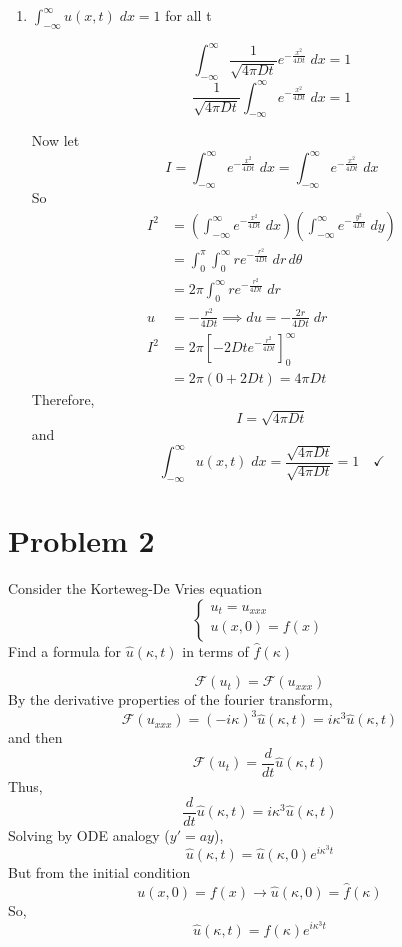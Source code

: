 \documentclass[12pt]{article}
\newcommand{\ans}[1]{\boxed{\text{#1}}}
\renewcommand{\hat}[1]{\widehat{#1}}
\newcommand{\F}[1]{\mathcal{F}(#1)}
\begin{document}
\begin{enumerate}
    \color{black}
    \item $\int_{-\infty}^\infty u(x, t) \; dx = 1$ for all t 
    
    \color{blue}
    \[\int_{-\infty}^\infty \frac{1}{\sqrt{4\pi Dt}}e^{-\frac{x^2}{4Dt}} \; dx = 1\]
    \[\frac{1}{\sqrt{4\pi Dt}}\int_{-\infty}^\infty e^{-\frac{x^2}{4Dt}} \; dx = 1 \]

    Now let 
    \[I = \int_{-\infty}^\infty e^{-\frac{x^2}{4Dt}} \; dx = \int_{-\infty}^\infty e^{-\frac{x^2}{4Dt}} \; dx \]
    So 
    \begin{align*}
        I^2 &= \left(\int_{-\infty}^\infty e^{-\frac{x^2}{4Dt}} \; dx \right)\left(\int_{-\infty}^\infty e^{-\frac{y^2}{4Dt}} \; dy \right)\\
        &= \int_{0}^\pi \int_{0}^\infty re^{-\frac{r^2}{4Dt}} \; dr \, d\theta\\
        &= 2\pi \int_{0}^\infty re^{-\frac{r^2}{4Dt}} \; dr\\
        u &= -\frac{r^2}{4Dt} \implies du = -\frac{2r}{4Dt}\; dr\\
        I^2 &= 2\pi \left[-2Dt e^{-\frac{r^2}{4Dt}}\right]_0^\infty\\
        &= 2\pi(0 + 2Dt) = 4\pi Dt
    \end{align*}
    Therefore, 
    \[I = \sqrt{4\pi Dt}\]
    and 
    \[\int_{-\infty}^\infty u(x, t) \; dx = \frac{\sqrt{4\pi Dt}}{\sqrt{4\pi Dt}} = 1 \quad \checkmark\]
\end{enumerate}

\pagebreak
\section*{Problem  2}
Consider the Korteweg-De Vries equation
\[\begin{cases}
    u_t = u_{xxx}\\
    u(x, 0) = f(x)
\end{cases}\]
Find a formula for $\hat{u}(\kappa, t)$ in terms of $\hat{f}(\kappa)$

\color{blue}
\[\F{u_t} = \F{u_{xxx}}\]
By the derivative properties of  the fourier transform,
\[\F{u_{xxx}} = (-i\kappa)^3 \hat{u}(\kappa, t) = i\kappa^3 \hat{u}(\kappa, t)\]
and then 
\[\F{u_t} = \frac{d}{dt}\hat{u}(\kappa, t)\]
Thus,
\[\frac{d}{dt}\hat{u}(\kappa, t) =  i\kappa^3 \hat{u}(\kappa, t)\]
Solving by ODE analogy ($y' = ay$),
\[\hat{u}(\kappa, t) = \hat{u}(\kappa, 0)e^{i\kappa^3t}\]
But from the initial condition
\[u(x, 0) = f(x) \longrightarrow \hat{u}(\kappa, 0) = \hat{f}(\kappa)\]
So,
\[\ans{$\hat{u}(\kappa, t) = \hat{f}(\kappa)e^{i\kappa^3t}$}\]
\end{document}
